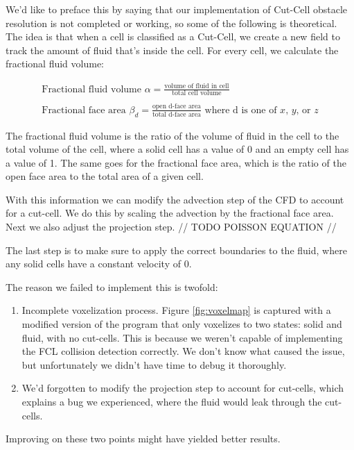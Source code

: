\documentclass[a4paper,12pt,titlepage]{article}
\begin{document}
We'd like to preface this by saying that our implementation of Cut-Cell obstacle
resolution is not completed or working, so some of the following is theoretical.
The idea is that when a cell is classified as a Cut-Cell, we create a new field to
track the amount of fluid that's inside the cell. For every cell, we calculate the
fractional fluid volume:

\[
	\begin{array}{ll}
		\text{Fractional fluid volume } \alpha = \frac{\text{volume of fluid in cell}}{\text{total cell volume}} \\
		\\
		\text{Fractional face area } \beta_d = \frac{\text{open d-face area}}{\text{total d-face area}} \text{ where d is one of $x$, $y$, or $z$}
	\end{array}
\]

The fractional fluid volume is the ratio of the volume of fluid in the cell to the
total volume of the cell, where a solid cell has a value of 0 and an empty cell has
a value of 1. The same goes for the fractional face area, which is the ratio of the
open face area to the total area of a given cell.

With this information we can modify the advection step of the CFD to account for
a cut-cell. We do this by scaling the advection by the fractional face area. Next
we also adjust the projection step. // TODO POISSON EQUATION //

The last step is to make sure to apply the correct boundaries to the fluid,
where any solid cells have a constant velocity of 0.

The reason we failed to implement this is twofold:
\begin{enumerate}
	\item{
			Incomplete voxelization process. Figure \ref{fig:voxelmap} is
			captured with a modified version of the program that only voxelizes
			to two states: solid and fluid, with no cut-cells. This is because we
			weren't capable of implementing the FCL collision detection correctly.
			We don't know what caused the issue, but unfortunately we didn't have
			time to debug it thoroughly.
	}
	\item{
			We'd forgotten to modify the projection step to account for cut-cells,
			which explains a bug we experienced, where the fluid would leak through
			the cut-cells.
		}
\end{enumerate}

Improving on these two points might have yielded better results.
\end{document}
